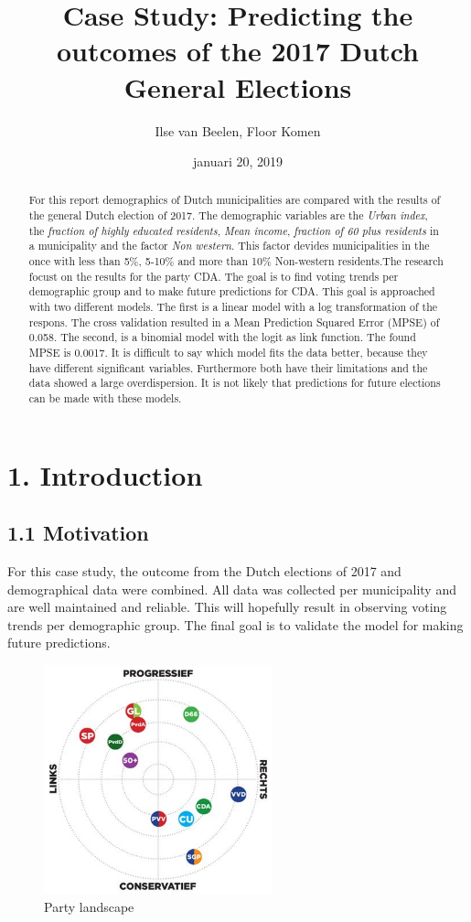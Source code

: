 \documentclass[11pt,]{article}
\title{Case Study: Predicting the outcomes of the 2017 Dutch General Elections}
\author{Ilse van Beelen, Floor Komen}
\date{januari 20, 2019}
\begin{document}
\maketitle
\begin{abstract}
For this report demographics of Dutch municipalities are compared with
the results of the general Dutch election of 2017. The demographic
variables are the \emph{Urban index}, the \emph{fraction of highly
educated residents}, \emph{Mean income}, \emph{fraction of 60 plus
residents} in a municipality and the factor \emph{Non western}. This
factor devides municipalities in the once with less than 5\%, 5-10\% and
more than 10\% Non-western residents.The research focust on the results
for the party CDA. The goal is to find voting trends per demographic
group and to make future predictions for CDA. This goal is approached
with two different models. The first is a linear model with a log
transformation of the respons. The cross validation resulted in a Mean
Prediction Squared Error (MPSE) of 0.058. The second, is a binomial
model with the logit as link function. The found MPSE is 0.0017. It is
difficult to say which model fits the data better, because they have
different significant variables. Furthermore both have their limitations
and the data showed a large overdispersion. It is not likely that
predictions for future elections can be made with these models.
\end{abstract}

\section{1. Introduction}\label{introduction}

\subsection{1.1 Motivation}\label{motivation}

For this case study, the outcome from the Dutch elections of 2017 and
demographical data were combined. All data was collected per
municipality and are well maintained and reliable. This will hopefully
result in observing voting trends per demographic group. The final goal
is to validate the model for making future predictions.

\begin{figure}
\centering
\includegraphics[width=2.60417in]{Partijlandschap.jpg}
\caption{Party landscape}
\end{figure}
\end{document}
